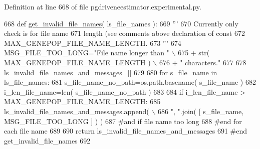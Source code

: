Definition at line 668 of file pgdriveneestimator.\+experimental.\+py.


\begin{DoxyCode}
668 \textcolor{keyword}{def }\hyperlink{namespacenegui_1_1pgdriveneestimator_a8972bdaeb431f941619300e9e63a0732}{get\_invalid\_file\_names}( ls\_file\_names ):
669     \textcolor{stringliteral}{'''}
670 \textcolor{stringliteral}{    Currently only check is for file name}
671 \textcolor{stringliteral}{    length (see comments above declaration of const }
672 \textcolor{stringliteral}{    MAX\_GENEPOP\_FILE\_NAME\_LENGTH.}
673 \textcolor{stringliteral}{    '''}
674     MSG\_FILE\_TOO\_LONG=\textcolor{stringliteral}{"File name longer than "} \(\backslash\)
675             + str( MAX\_GENEPOP\_FILE\_NAME\_LENGTH ) \(\backslash\)
676             + \textcolor{stringliteral}{" characters."}
677 
678     ls\_invalid\_file\_names\_and\_messages=[]
679 
680     \textcolor{keywordflow}{for} s\_file\_name \textcolor{keywordflow}{in} ls\_file\_names:
681         s\_file\_name\_no\_path=os.path.basename( s\_file\_name )
682         i\_len\_file\_name=len( s\_file\_name\_no\_path )
683 
684         \textcolor{keywordflow}{if} i\_len\_file\_name > MAX\_GENEPOP\_FILE\_NAME\_LENGTH:
685             ls\_invalid\_file\_names\_and\_messages.append( \(\backslash\)
686                     \textcolor{stringliteral}{", "}.join( [ s\_file\_name, MSG\_FILE\_TOO\_LONG ] ) )
687         \textcolor{comment}{#and if file name too long}
688     \textcolor{comment}{#end for each file name}
689 
690     \textcolor{keywordflow}{return} ls\_invalid\_file\_names\_and\_messages
691 \textcolor{comment}{#end get\_invalid\_file\_names}
692 
\end{DoxyCode}
